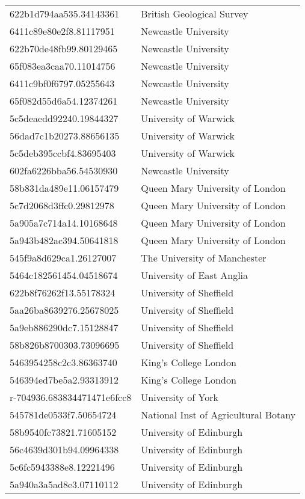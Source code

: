 \begin{tabular}{ll}
622b1d794aa535.34143361 & British Geological Survey \\
6411c89e80e2f8.81117951 & Newcastle University \\
622b70de48fb99.80129465 & Newcastle University \\
65f083ea3caa70.11014756 & Newcastle University \\
6411c9bf0f6797.05255643 & Newcastle University \\
65f082d55d6a54.12374261 & Newcastle University \\
5c5deaedd92240.19844327 & University of Warwick \\
56dad7c1b20273.88656135 & University of Warwick \\
5c5deb395ccbf4.83695403 & University of Warwick \\
602fa6226bba56.54530930 & Newcastle University \\
58b831da489e11.06157479 & Queen Mary University of London \\
5c7d2068d3ffc0.29812978 & Queen Mary University of London \\
5a905a7c714a14.10168648 & Queen Mary University of London \\
5a943b482ac394.50641818 & Queen Mary University of London \\
545f9a8d629ca1.26127007 & The University of Manchester \\
5464c182561454.04518674 & University of East Anglia \\
622b8f76262f13.55178324 & University of Sheffield \\
5aa26ba8639276.25678025 & University of Sheffield \\
5a9eb886290dc7.15128847 & University of Sheffield \\
58b826b8700303.73096695 & University of Sheffield \\
5463954258c2c3.86363740 & King's College London \\
546394ed7be5a2.93313912 & King's College London \\
r-704936.683834471471e6fcc8 & University of York \\
545781de0533f7.50654724 & National Inst of Agricultural Botany \\
58b9540fc73821.71605152 & University of Edinburgh \\
56c4639d301b94.09964338 & University of Edinburgh \\
5c6fc5943388e8.12221496 & University of Edinburgh \\
5a940a3a5ad8e3.07110112 & University of Edinburgh \\

\end{tabular}
